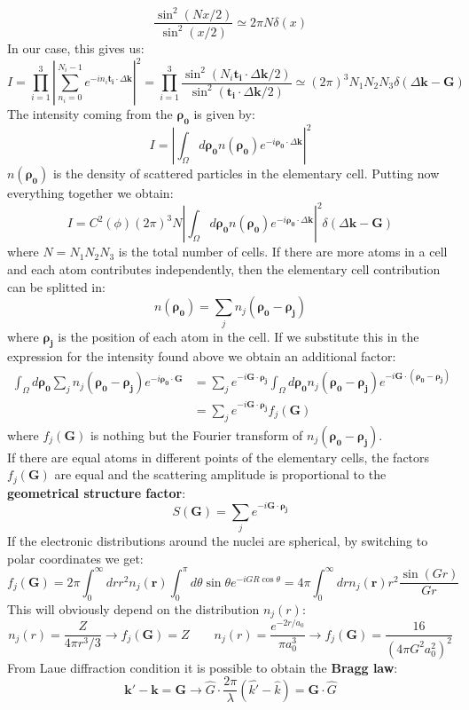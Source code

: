 \documentclass[10.75pt,a4paper,openright,bottom=2cm]{article}
\renewcommand{\Vec}[1]{\boldsymbol{#1}}
\begin{document}
\[
\frac{\sin^2(Nx/2)}{\sin^2(x/2)}\simeq2\pi N\delta(x)
\]
In our case, this gives us:
\[
I=\prod_{i=1}^3\left|\sum_{n_i=0}^{N_i-1}e^{-in_i\Vec{t_i}\cdot\Delta\Vec{k}}\right|^2=\prod_{i=1}^3\frac{\sin^2(N_i\Vec{t_i}\cdot\Delta\Vec{k}/2)}{\sin^2(\Vec{t_i}\cdot\Delta\Vec{k}/2)}\simeq(2\pi)^3N_1N_2N_3\delta(\Delta\Vec{k}-\Vec{G})
\]
The intensity coming from the $\Vec{\rho_0}$ is given by:
\[
I=\left|\int_\Omega d\Vec{\rho_0}n(\Vec{\rho_0})e^{-i\Vec{\rho_0}\cdot\Delta\Vec{k}}\right|^2
\]
$n(\Vec{\rho_0})$ is the density of scattered particles in the elementary cell. Putting now everything together we obtain:
\[
I=C^2(\phi)(2\pi)^3N\left|\int_\Omega d\Vec{\rho_0}n(\Vec{\rho_0})e^{-i\Vec{\rho_0}\cdot\Delta\Vec{k}}\right|^2\delta(\Delta\Vec{k}-\Vec{G})
\]
where $N=N_1N_2N_3$ is the total number of cells. If there are more atoms in a cell and each atom contributes independently, then the elementary cell contribution can be splitted in:
\[
n(\Vec{\rho_0})=\sum_jn_j(\Vec{\rho_0}-\Vec{\rho_j})
\]
where $\Vec{\rho_j}$ is the position of each atom in the cell. If we substitute this in the expression for the intensity found above we obtain an additional factor:
\begin{align*}
\int_\Omega d\Vec{\rho_0}\sum_jn_j(\Vec{\rho_0}-\Vec{\rho_j})e^{-i\Vec{\rho_0}\cdot\Vec{G}}&=\sum_je^{-i\Vec{G}\cdot\Vec{\rho_j}}\int_\Omega d\Vec{\rho_0}n_j(\Vec{\rho_0}-\Vec{\rho_j})e^{-i\Vec{G}\cdot(\Vec{\rho_0}-\Vec{\rho_j})}\\
&=\sum_je^{-i\Vec{G}\cdot\Vec{\rho_j}}f_j(\Vec{G})
\end{align*}
where $f_j(\Vec{G})$ is nothing but the Fourier transform of $n_j(\Vec{\rho_0}-\Vec{\rho_j})$.\\
If there are equal atoms in different points of the elementary cells, the factors $f_j(\Vec{G})$ are equal and the scattering amplitude is proportional to the \textbf{geometrical structure factor}:
\[
S(\Vec{G})=\sum_je^{-i\Vec{G}\cdot\Vec{\rho_j}}
\]
If the electronic distributions around the nuclei are spherical, by switching to polar coordinates we get:
\[
f_j(\Vec{G})=2\pi\int_0^\infty drr^2n_j(\Vec{r})\int_0^\pi d\theta\sin\theta e^{-iGR\cos\theta}=4\pi\int_0^\infty drn_j(\Vec{r})r^2\frac{\sin(Gr)}{Gr}
\]
This will obviously depend on the distribution $n_j(r)$:
\[
n_j(r)=\frac{Z}{4\pi r^3/3}\to f_j(\Vec{G})=Z \qquad n_j(r)=\frac{e^{-2r/a_0}}{\pi a_0^3}\to f_j(\Vec{G})=\frac{16}{(4\pi G^2a_0^2)^2}
\]
From Laue diffraction condition it is possible to obtain the \textbf{Bragg law}:
\[
\Vec{k}'-\Vec{k}=\Vec{G}\to\hat{G}\cdot\frac{2\pi}{\lambda}(\hat{k'}-\hat{k})=\Vec{G}\cdot\hat{G}
\]
\end{document}
